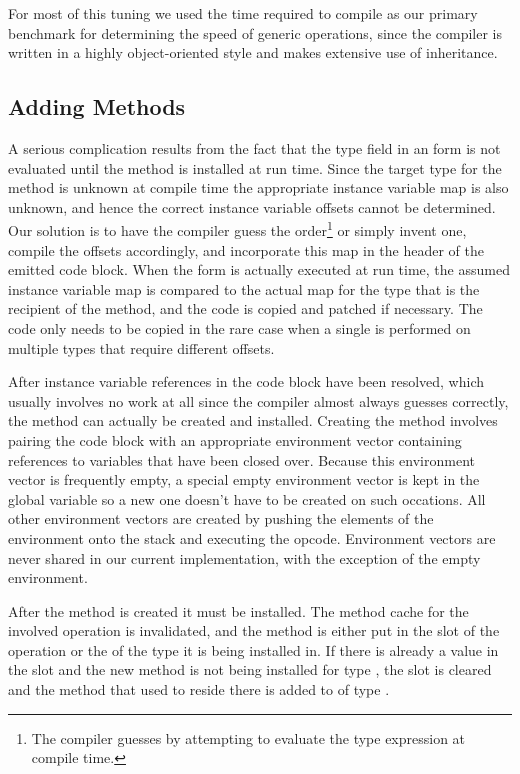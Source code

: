 For most of this tuning we used the time required to compile
 as our primary benchmark for determining the
speed of generic operations, since the compiler is written in a highly
object-oriented style and makes extensive use of inheritance.



\subsection{Adding Methods}

A serious complication results from the fact that the type field in an
 form is not evaluated until the method is installed at
run time.  Since the target type for the method is unknown at compile
time the appropriate instance variable map is also unknown, and hence
the correct instance variable offsets cannot be determined.  Our
solution is to have the compiler guess the order\footnote{The compiler
guesses by attempting to evaluate the type expression at compile
time.} or simply invent one, compile the offsets accordingly, and
incorporate this map in the header of the emitted code block.  When
the  form is actually executed at run time, the assumed
instance variable map is compared to the actual map for the type that
is the recipient of the method, and the code is copied and patched if
necessary.  The code only needs to be copied in the rare case when a
single  is performed on multiple types that require
different offsets.

After instance variable references in the code block have been
resolved, which usually involves no work at all since the compiler
almost always guesses correctly, the method can actually be created
and installed.  Creating the method involves pairing the code block
with an appropriate environment vector containing references to
variables that have been closed over.  Because this environment vector
is frequently empty, a special empty environment vector is kept in the
global variable  so a new one doesn't have to
be created on such occations.  All other environment vectors are
created by pushing the elements of the environment onto the stack and
executing the  opcode.  Environment
vectors are never shared in our current implementation, with the
exception of the empty environment.

After the method is created it must be installed.  The method cache
for the involved operation is invalidated, and the method is either
put in the  slot of the operation or the
 of the type it is being installed in.  If
there is already a value in the  slot and the new method
is not being installed for type , the  slot is
cleared and the method that used to reside there is added to
 of type .

